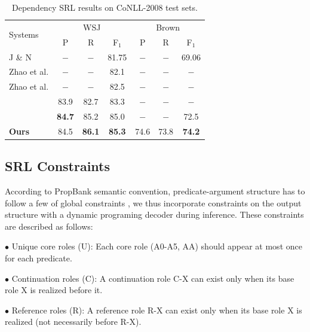 \documentclass[letterpaper]{article} %
\begin{document}
\begin{table}
	\centering
	\setlength{\tabcolsep}{4pt}
	\begin{tabular}{lcccccc}
		\toprule  
		\multirow{2}{*}{Systems}&\multicolumn{3}{c}{WSJ}&\multicolumn{3}{c}{Brown}\\  
		\cmidrule(lr){2-4} \cmidrule(lr){5-7}
		&P&R&F$_1$&P&R&F$_1$ \\  
		\midrule
		J \& N \shortcite{Johansson2008Dependency} &$-$&$-$&81.75&$-$&$-$&69.06\\
		Zhao et al. \shortcite{zhao2009} & $-$ & $-$ & 82.1 & $-$ & $-$ & $-$ \\
		Zhao et al. \shortcite{zhao-jair-2013} & $-$ & $-$ & 82.5 & $-$ & $-$ & $-$ \\
		\citeauthor{he:2018Syntax} \shortcite{he:2018Syntax} &83.9&82.7&83.3&$-$&$-$&$-$\\
		\citeauthor{cai2018full}\shortcite{cai2018full}&\textbf{84.7}&85.2&85.0&$-$&$-$&72.5\\
		\textbf{Ours} &84.5&\textbf{86.1}&\textbf{85.3}&74.6&73.8&\textbf{74.2} \\  
		\bottomrule
	\end{tabular}
	\caption{Dependency SRL results on CoNLL-2008 test sets.}\label{tab:end-for-dependency}
\end{table}

\subsection{SRL Constraints}
According to PropBank semantic convention, predicate-argument structure has to follow a few of global constraints \cite{punyakanok2008importance,he-acl2017}, we thus incorporate constraints on the output structure with a dynamic programing decoder during inference. These constraints are described as follows:

$\bullet$ Unique core roles (U): Each core role (A0-A5, AA) should appear at most once for each predicate.

$\bullet$ Continuation roles (C): A continuation role C-X can exist only when its base role X is realized before it.

$\bullet$ Reference roles (R): A reference role R-X can exist only when its base role X is realized (not necessarily before R-X).
\end{document}
